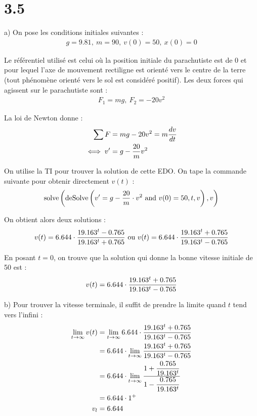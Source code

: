 \section*{3.5}

a) On pose les conditions initiales suivantes :
\begin{align*}
    g = 9.81,\ m = 90,\ v(0) = 50,\ x(0) = 0
\end{align*}

Le référentiel utilisé est celui où la position initiale du parachutiste est
de 0 et pour lequel l'axe de mouvement rectiligne est orienté vers le centre
de la terre (tout phénomène orienté vers le sol est considéré positif). Les deux
forces qui agissent sur le parachutiste sont :
\begin{align*}
    F_1 = mg,\ F_2 = -20v^2
\end{align*}

La loi de Newton donne :
\begin{align*}
    \sum{F} &= mg - 20v^2 = m\dfrac{d v}{d t} \\
    \iff v' &= g - \dfrac{20}{m}v^2
\end{align*}

On utilise la TI pour trouver la solution de cette EDO. On tape la commande
suivante pour obtenir directement $v(t)$ :
\begin{align*}
    \operatorname{solve}\left({\operatorname{deSolve}\left({v'=g-\dfrac{20}{m}\cdot v^2\ \text{and }
    v(0)=50, t, v}\right),v}\right)
\end{align*}

On obtient alors deux solutions :
\begin{align*}
    v(t) = 6.644\cdot\dfrac{19.163^t - 0.765}{19.163^t + 0.765}\ \text{ou }
    v(t) = 6.644\cdot\dfrac{19.163^t + 0.765}{19.163^t - 0.765}
\end{align*}

En posant $t=0$, on trouve que la solution qui donne la bonne vitesse initiale
de 50 est :
\begin{align*}
    v(t) = 6.644\cdot\dfrac{19.163^t + 0.765}{19.163^t - 0.765}
\end{align*}

b) Pour trouver la vitesse terminale, il suffit de prendre la limite quand $t$
tend vers l'infini :
\begin{align*}
    \lim_{t\to\infty} v(t) &= \lim_{t\to\infty}
    6.644\cdot\dfrac{19.163^t + 0.765}{19.163^t - 0.765} \\
    &= 6.644\cdot\lim_{t\to\infty}\dfrac{19.163^t + 0.765}{19.163^t - 0.765} \\
    &= 6.644\cdot\lim_{t\to\infty}\dfrac{1 + \dfrac{0.765}{19.163^t}}{1 - \dfrac{0.765}{19.163^t}} \\
    &= 6.644\cdot 1^+ \\
    v_l&= 6.644
\end{align*}

